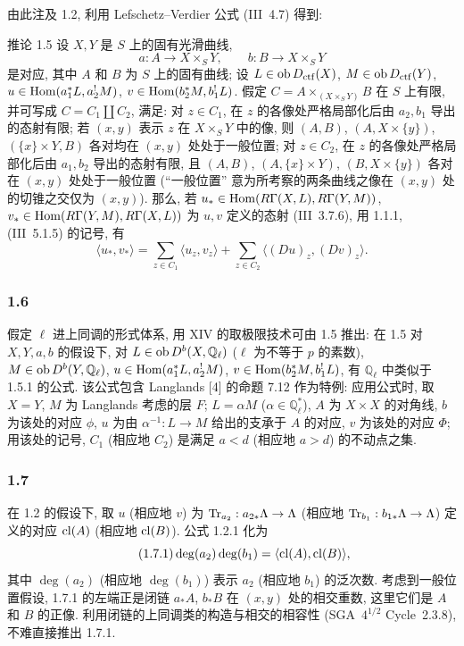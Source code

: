 由此注及 1.2, 利用 Lefschetz--Verdier 公式 (III~4.7) 得到:

\begin{statement}{推论 1.5}
设 $X,Y$ 是 $S$ 上的固有光滑曲线,
\[
a:A\longrightarrow X\times_S Y,
\qquad
b:B\longrightarrow X\times_S Y
\]
是对应, 其中 $A$ 和 $B$ 为 $S$ 上的固有曲线; 设 $L\in\allowbreak \operatorname{ob} D_{\mathrm{ctf}}(X)$, $M\in\allowbreak \operatorname{ob} D_{\mathrm{ctf}}(Y)$, $u\in\allowbreak \operatorname{Hom}(a_1^*L,a_2^!M)$, $v\in\allowbreak \operatorname{Hom}(b_2^*M,b_1^!L)$. 假定 $C=\allowbreak A\times_{(X\times_S Y)}B$ 在 $S$ 上有限, 并可写成 $C=\allowbreak C_1\amalg C_2$, 满足: 对 $z\in\allowbreak  C_1$, 在 $z$ 的各像处严格局部化后由 $a_2,b_1$ 导出的态射有限; 若 $(x,y)$ 表示 $z$ 在 $X\times_S Y$ 中的像, 则 $(A,B)$, $(A,X\times\{y\})$, $(\{x\}\times Y,B)$ 各对均在 $(x,y)$ 处处于一般位置; 对 $z\in\allowbreak  C_2$, 在 $z$ 的各像处严格局部化后由 $a_1,b_2$ 导出的态射有限, 且 $(A,B)$, $(A,\{x\}\times Y)$, $(B,X\times\{y\})$ 各对在 $(x,y)$ 处处于一般位置 (``一般位置'' 意为所考察的两条曲线之像在 $(x,y)$ 处的切锥之交仅为 $(x,y)$). 那么, 若 $u_*\in\allowbreak \operatorname{Hom}(R\Gamma(X,L),R\Gamma(Y,M))$, $v_*\in\allowbreak \operatorname{Hom}(R\Gamma(Y,M),R\Gamma(X,L))$ 为 $u,v$ 定义的态射 (III~3.7.6), 用 1.1.1, (III~5.1.5) 的记号, 有
\begin{equation}\tag{1.5.1}
\langle u_*,v_*\rangle=\sum_{z\in C_1}\langle u_z,v_z\rangle+\sum_{z\in C_2}\langle (Du)_z,(Dv)_z\rangle.
\end{equation}
\end{statement}

\subsubsection*{1.6}
假定 $\ell$ 进上同调的形式体系, 用 XIV 的取极限技术可由 1.5 推出: 在 1.5 对 $X,Y,a,b$ 的假设下, 对 $L\in\operatorname{ob} D^b(X,\mathbb Q_\ell)$ ($\ell$ 为不等于 $p$ 的素数), $M\in\operatorname{ob} D^b(Y,\mathbb Q_\ell)$, $u\in\operatorname{Hom}(a_1^*L,a_2^!M)$, $v\in\operatorname{Hom}(b_2^*M,b_1^!L)$, 有 $\mathbb Q_\ell$ 中类似于 1.5.1 的公式. 该公式包含 Langlands [4] 的命题 7.12 作为特例: 应用公式时, 取 $X=Y$, $M$ 为 Langlands 考虑的层 $F$; $L=\alpha M$ ($\alpha\in\mathbb Q_\ell^*$), $A$ 为 $X\times X$ 的对角线, $b$ 为该处的对应 $\phi$, $u$ 为由 $\alpha^{-1}:L\to M$ 给出的支承于 $A$ 的对应, $v$ 为该处的对应 $\Phi$; 用该处的记号, $C_1$ (相应地 $C_2$) 是满足 $a<d$ (相应地 $a>d$) 的不动点之集.

\subsubsection*{1.7}
在 1.2 的假设下, 取 $u$ (相应地 $v$) 为 $\operatorname{Tr}_{a_2}:a_{2*}\Lambda\to\Lambda$ (相应地 $\operatorname{Tr}_{b_1}:b_{1*}\Lambda\to\Lambda$) 定义的对应 $\operatorname{cl}(A)$ (相应地 $\operatorname{cl}(B)$). 公式 1.2.1 化为
\begin{equation}\tag{1.7.1}
\deg(a_2)\deg(b_1)=\langle \operatorname{cl}(A),\operatorname{cl}(B)\rangle,
\end{equation}
其中 $\deg(a_2)$ (相应地 $\deg(b_1)$) 表示 $a_2$ (相应地 $b_1$) 的泛次数. 考虑到一般位置假设, 1.7.1 的左端正是闭链 $a_*A$, $b_*B$ 在 $(x,y)$ 处的相交重数, 这里它们是 $A$ 和 $B$ 的正像. 利用闭链的上同调类的构造与相交的相容性 (SGA~$4^{1/2}$ Cycle~2.3.8), 不难直接推出 1.7.1.


